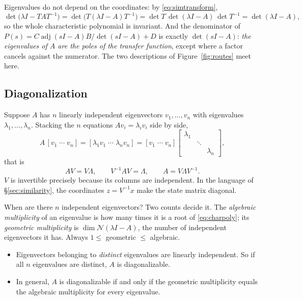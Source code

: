 \documentclass[11pt]{article}
\begin{document}
Eigenvalues do not depend on the coordinates: by \eqref{eq:simtransform},
\[
   \det\bigl(\lambda I-TAT^{-1}\bigr) = \det\bigl(T(\lambda I-A)T^{-1}\bigr)
   = \det T\,\det(\lambda I-A)\,\det T^{-1} = \det(\lambda I-A),
\]
so the whole characteristic polynomial is invariant. And the denominator of
$P(s)=C\operatorname{adj}(sI-A)B/\det(sI-A)+D$ is exactly $\det(sI-A)$: \emph{the
eigenvalues of $A$ are the poles of the transfer function}, except where a factor
cancels against the numerator. The two descriptions of Figure~\ref{fig:routes}
meet here.

\subsection{Diagonalization}\label{sec:diag}
Suppose $A$ has $n$ linearly independent eigenvectors $v_1,\dots,v_n$ with
eigenvalues $\lambda_1,\dots,\lambda_n$. Stacking the $n$ equations
$Av_i=\lambda_iv_i$ side by side,
\[
   A\,[v_1\;\cdots\;v_n] = [\lambda_1v_1\;\cdots\;\lambda_nv_n]
   = [v_1\;\cdots\;v_n]
     \begin{bmatrix}\lambda_1&&\\&\ddots&\\&&\lambda_n\end{bmatrix},
\]
that is
\begin{equation}\label{eq:diagonalize}
   AV = V\Lambda,\qquad V^{-1}AV=\Lambda,\qquad A = V\Lambda V^{-1}.
\end{equation}
$V$ is invertible precisely because its columns are independent. In the language of
\S\ref{sec:similarity}, the coordinates $z=V^{-1}x$ make the state matrix diagonal.

When are there $n$ independent eigenvectors? Two counts decide it. The
\emph{algebraic multiplicity} of an eigenvalue is how many times it is a root of
\eqref{eq:charpoly}; its \emph{geometric multiplicity} is
$\dim\mathcal N(\lambda I-A)$, the number of independent eigenvectors it has.
Always $1\le$ geometric $\le$ algebraic.
\begin{itemize}[leftmargin=*,itemsep=2pt]
\item Eigenvectors belonging to \emph{distinct} eigenvalues are linearly
independent. So if all $n$ eigenvalues are distinct, $A$ is diagonalizable.
\item In general, $A$ is diagonalizable if and only if the geometric multiplicity
equals the algebraic multiplicity for every eigenvalue.
\end{itemize}
\end{document}
